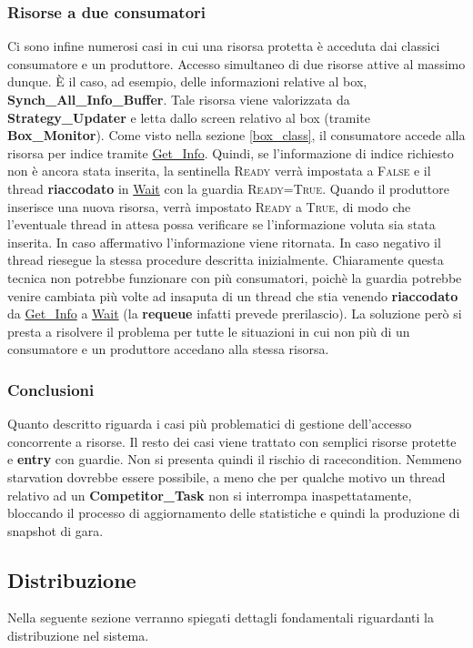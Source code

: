 \subsubsection{Risorse a due consumatori}
Ci sono infine numerosi casi in cui una risorsa protetta \`{e} acceduta dai classici consumatore e un produttore. Accesso simultaneo di due risorse attive al massimo dunque.
\`{E} il caso, ad esempio, delle informazioni relative al box, \textbf{Synch\_All\_Info\_Buffer}. Tale risorsa viene valorizzata da \textbf{Strategy\_Updater} e 
letta dallo screen relativo al box (tramite \textbf{Box\_Monitor}). Come visto nella sezione \ref{box_class}, il consumatore accede alla risorsa per indice tramite 
\underline{Get\_Info}. Quindi,
se l'informazione di indice richiesto non \`{e} ancora stata inserita, la sentinella \textsc{Ready} verr\`{a} impostata a \textsc{False} e il thread \textbf{riaccodato} in \underline{Wait}
con la guardia \textsc{Ready=True}. Quando il produttore inserisce una nuova risorsa, verr\`{a} impostato \textsc{Ready} a \textsc{True}, di modo che l'eventuale
thread in attesa possa verificare se l'informazione voluta sia stata inserita. In caso affermativo l'informazione viene ritornata. In caso negativo il thread riesegue
la stessa procedure descritta inizialmente. Chiaramente questa tecnica non potrebbe funzionare con pi\`{u} consumatori, poich\`{e} la guardia potrebbe venire cambiata
pi\`{u} volte ad insaputa di un thread che stia venendo \textbf{riaccodato} da \underline{Get\_Info} a \underline{Wait} (la \textbf{requeue} infatti prevede prerilascio). La
soluzione per\`{o} si presta a risolvere il problema per tutte le situazioni in cui non pi\`{u} di un consumatore e un produttore accedano alla stessa risorsa.
\subsubsection{Conclusioni}
Quanto descritto riguarda i casi pi\`{u} problematici di gestione dell'accesso concorrente a risorse. Il resto dei casi viene trattato con semplici risorse protette
e \textbf{entry} con guardie. Non si presenta quindi il rischio di racecondition. Nemmeno starvation dovrebbe essere possibile, 
a meno che per qualche motivo un thread relativo ad un \textbf{Competitor\_Task}
non si interrompa inaspettatamente, bloccando il processo di aggiornamento delle statistiche e quindi la produzione di snapshot di gara.
\subsection{Distribuzione}
Nella seguente sezione verranno spiegati dettagli fondamentali riguardanti la distribuzione nel sistema.
